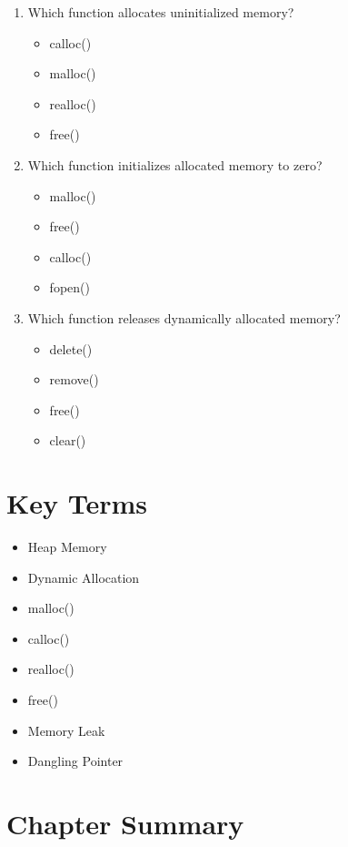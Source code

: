 \documentclass[12pt,openany]{book}
\begin{document}
\begin{enumerate}
    \item Which function allocates uninitialized memory?
    \begin{itemize}
        \item calloc()
        \item malloc()
        \item realloc()
        \item free()
    \end{itemize}

    \item Which function initializes allocated memory to zero?
    \begin{itemize}
        \item malloc()
        \item free()
        \item calloc()
        \item fopen()
    \end{itemize}

    \item Which function releases dynamically allocated memory?
    \begin{itemize}
        \item delete()
        \item remove()
        \item free()
        \item clear()
    \end{itemize}
\end{enumerate}

\section{Key Terms}

\begin{itemize}
    \item Heap Memory
    \item Dynamic Allocation
    \item malloc()
    \item calloc()
    \item realloc()
    \item free()
    \item Memory Leak
    \item Dangling Pointer
\end{itemize}

\section{Chapter Summary}
\end{document}
